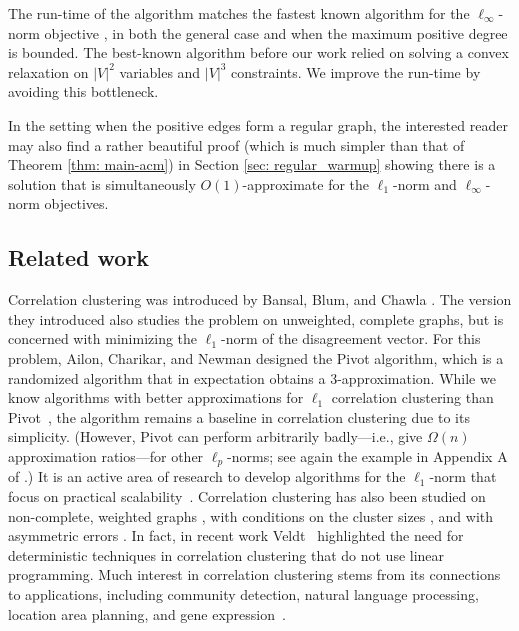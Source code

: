 The run-time of the algorithm matches the fastest known algorithm for the $\ell_\infty$-norm objective \cite{DMN23}, 
in both the general case and when the maximum positive degree is bounded.
The best-known algorithm before our work relied on solving a convex relaxation on $|V|^2$ variables and $|V|^3$ constraints.
We improve the run-time by avoiding this bottleneck.

In the setting when the positive edges form a regular graph, 
the interested reader may also find a rather beautiful proof (which is much simpler than that of Theorem \ref{thm: main-acm}) in Section \ref{sec: regular_warmup} showing there is a solution that is simultaneously $O(1)$-approximate for the $\ell_1$-norm and $\ell_{\infty}$-norm objectives.

\subsection{Related work}
\label{sec:related}
Correlation clustering was introduced by 
Bansal, Blum, and Chawla \citeyearpar{BBC04}.
The version they introduced also studies the problem on unweighted, complete graphs, but is concerned with minimizing the $\ell_1$-norm of the disagreement vector.
For this problem, Ailon, Charikar, and Newman \citeyearpar{ACN-pivot} designed the Pivot algorithm, which is a randomized algorithm that in expectation obtains a 3-approximation.
While we know algorithms with better approximations for $\ell_1$ correlation clustering than Pivot~\cite{chawla2015near, cohen2022correlation}, 
the algorithm remains a baseline in correlation clustering due to its simplicity. (However, Pivot can perform arbitrarily badly---i.e., give $\Omega(n)$ approximation ratios---for other $\ell_p$-norms; see again the example in Appendix A of \cite{PM16}.)
It is an active area of research to develop algorithms for the $\ell_1$-norm that focus on practical scalability~\cite{bonchi2014, chierichetti2014, pan2014scaling, SDELM21, single-pass2023}. 
Correlation clustering has also been studied on non-complete, weighted graphs \cite{CGS17, KMZ19}, with conditions on the cluster sizes \cite{puleo2015correlation}, and with asymmetric errors \cite{JafarovKMM21}. 
In fact, in recent work Veldt~\cite{veldt2022correlation} highlighted the need for deterministic techniques in correlation clustering that do not use linear programming.
Much interest in correlation clustering stems from its connections to applications,
including community detection, natural language processing, location area planning, and gene expression~\cite{veldt2018, SDELM21, Wirth17, mccallum2004conditional, ben1999clustering, demaine2003correlation}.


